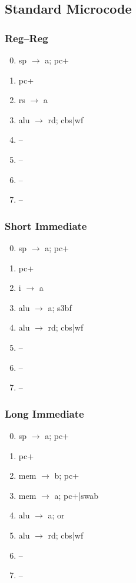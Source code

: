 \documentclass[11pt]{book}
\begin{document}
\subsection*{Standard Microcode}
\begin{multicols}{3}\ttfamily\selectfont\small
  \subsubsection*{Reg--Reg}
  \begin{enumerate}\setcounter{enumi}{-1}
  \item sp \(\rightarrow\) a; pc+
  \item pc+
  \item rs \(\rightarrow\) a
  \item alu \(\rightarrow\) rd; cbs|wf
  \item --
  \item --
  \item --
  \item --
  \end{enumerate}
  \columnbreak
  \subsubsection*{Short Immediate}
  \begin{enumerate}\setcounter{enumi}{-1}
  \item sp \(\rightarrow\) a; pc+
  \item pc+
  \item i \(\rightarrow\) a
  \item alu \(\rightarrow\) a; s3bf
  \item alu \(\rightarrow\) rd; cbs|wf
  \item --
  \item --
  \item --
  \end{enumerate}
  \columnbreak
  \subsubsection*{Long Immediate}
  \begin{enumerate}\setcounter{enumi}{-1}
  \item sp \(\rightarrow\) a; pc+
  \item pc+
  \item mem \(\rightarrow\) b; pc+
  \item mem \(\rightarrow\) a; pc+|swab
  \item alu \(\rightarrow\) a; or
  \item alu \(\rightarrow\) rd; cbs|wf
  \item --
  \item --
  \end{enumerate}
\end{multicols}
\end{document}
